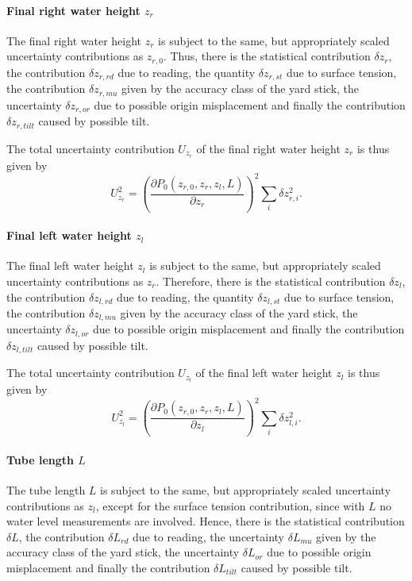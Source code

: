 \documentclass[a4paper,10pt, twocolumn]{article}
\begin{document}
\paragraph{Final right water height $z_r$} The final right water height $z_r$ is subject to the same, but appropriately scaled uncertainty contributions as $z_{r,0}$. Thus, there is the statistical contribution $\delta z_r$, the contribution $\delta z_{r,rd}$ due to reading, the quantity $\delta z_{r,st}$ due to surface tension, the contribution $\delta z_{r,mu}$ given by the accuracy class of the yard stick, the uncertainty $\delta z_{r,or}$ due to possible origin misplacement and finally the contribution $\delta z_{r,tilt}$ caused by possible tilt.

The total uncertainty contribution $U_{z_{r}}$ of the final right water height $z_{r}$ is thus given by \begin{equation}
	U_{z_{r}}^2 = \left(\frac{\partial P_0(z_{r,0}, z_r, z_l, L)}{\partial z_{r}}\right)^2\sum_{i}\delta z_{r,i}^2.
\end{equation}

\paragraph{Final left water height $z_l$} The final left water height $z_l$ is subject to the same, but appropriately scaled uncertainty contributions as $z_{r}$. Therefore, there is the statistical contribution $\delta z_l$, the contribution $\delta z_{l,rd}$ due to reading, the quantity $\delta z_{l,st}$ due to surface tension, the contribution $\delta z_{l,mu}$ given by the accuracy class of the yard stick, the uncertainty $\delta z_{l,or}$ due to possible origin misplacement and finally the contribution $\delta z_{l,tilt}$ caused by possible tilt.

The total uncertainty contribution $U_{z_{l}}$ of the final left water height $z_{l}$ is thus given by \begin{equation}
	U_{z_{l}}^2 = \left(\frac{\partial P_0(z_{r,0}, z_r, z_l, L)}{\partial z_{l}}\right)^2\sum_{i}\delta z_{l,i}^2.
\end{equation}

\paragraph{Tube length $L$} The tube length $L$ is subject to the same, but appropriately scaled uncertainty contributions as $z_{l}$, except for the surface tension contribution, since with $L$ no water level measurements are involved. Hence, there is the statistical contribution $\delta L$, the contribution $\delta L_{rd}$ due to reading, the uncertainty $\delta L_{mu}$ given by the accuracy class of the yard stick, the uncertainty $\delta L_{or}$ due to possible origin misplacement and finally the contribution $\delta L_{tilt}$ caused by possible tilt.
\end{document}
